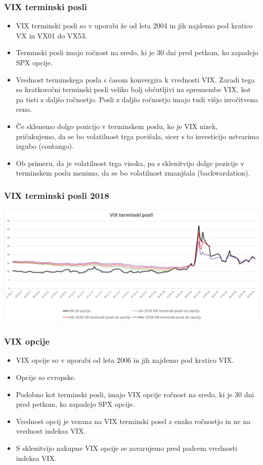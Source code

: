 \documentclass[10pt]{beamer}
\begin{document}
\begin{frame}
\frametitle{VIX terminski posli}
\begin{itemize}
\item VIX terminski posli so v uporabi že od leta 2004 in jih najdemo pod kratico VX in VX01 do VX53.
\item Terminski posli imajo ročnost na sredo, ki je 30 dni pred petkom, ko zapadejo SPX opcije.
\item Vrednost terminskega posla s časom konvergira k vrednosti VIX. Zaradi tega so kratkoročni terminski posli veliko bolj občutljivi na spremembe VIX, kot pa tisti z daljšo ročnostjo. Posli z daljšo ročnostjo imajo tudi višjo izročitveno ceno.
\item Če sklenemo dolgo pozicijo v terminskem poslu, ko je VIX nizek, pričakujemo, da se bo volatilnost trga povišala, sicer s to investicijo ustvarimo izgubo (contango). 
\item Ob primeru, da je volatilnost trga visoka, pa s sklenitvijo dolge pozicije v terminskem poslu menimo, da se bo volatilnost zmanjšala (backwardation). 
\end{itemize}
\end{frame}

\begin{frame}
\frametitle{VIX terminski posli 2018}
\includegraphics[width=1\textwidth]{./Grafi/VIX futures 2018.png}
\end{frame}

\begin{frame}
\frametitle{VIX opcije}
\begin{itemize}
\item VIX opcije so v uporabi od leta 2006 in jih najdemo pod kratico VIX.
\item Opcije so evropske.
\item Podobno kot terminski posli, imajo VIX opcije ročnost na sredo, ki je 30 dni pred petkom, ko zapadejo SPX opcije.
\item Vrednost opcij je vezana na VIX terminski posel z enako ročnostjo in ne na vrednost indeksa VIX.
\item S sklenitvijo nakupne VIX opcije se zavarujemo pred padcem vrednosti indeksa VIX.
\end{itemize}
\end{frame}
\end{document}
